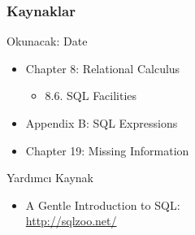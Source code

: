 \documentclass[dvipsnames]{beamer}
\theoremstyle{definition}
\theoremstyle{example}
\theoremstyle{plain}
\begin{document}
\begin{frame}
  \frametitle{Kaynaklar}

  \begin{block}{Okunacak: Date}
    \begin{itemize}
      \item Chapter 8: Relational Calculus
      \begin{itemize}
        \item 8.6. \alert{SQL Facilities}
      \end{itemize}
      \item Appendix B: \alert{SQL Expressions}
      \item Chapter 19: Missing Information
    \end{itemize}
  \end{block}

  \begin{block}{Yardımcı Kaynak}
    \begin{itemize}
      \item A Gentle Introduction to SQL:\\
	\url{http://sqlzoo.net/}
    \end{itemize}
  \end{block}
\end{frame}
\end{document}
